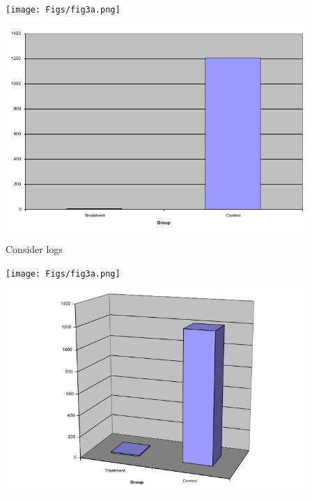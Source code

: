 \documentclass[12pt]{article}
\newcommand{\headsize}{\fontsize{35}{35} \selectfont}
\begin{document}
\begin{minipage}[t]{4.5in}
\vspace*{0cm}

\texttt{[image: Figs/fig3a.png]}
\end{minipage}
\hfill
\begin{minipage}[t]{4.5in}
\vspace*{0cm}

\includegraphics[width=4.5in]{Figs/fig3c.png}
\end{minipage}


\newpage

\addtocounter{page}{-1}

\headsize \color{yellow}
\hfill \begin{minipage}{5.75in}
\centering
Consider logs
\end{minipage}

\vspace{30mm}

\begin{minipage}[t]{4.5in}
\vspace*{0cm}

\texttt{[image: Figs/fig3a.png]}
\end{minipage}
\hfill
\begin{minipage}[t]{4.5in}
\vspace*{0cm}

\includegraphics[width=4.5in]{Figs/fig3d.png}
\end{minipage}
\end{document}
